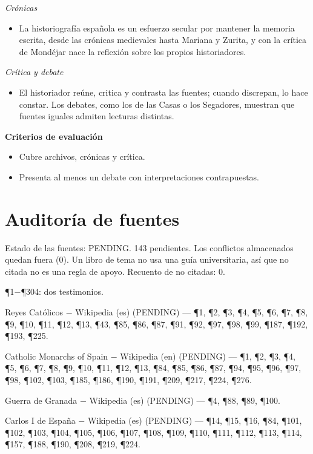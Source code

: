 \documentclass{book}
\begin{document}
\noindent\textit{Crónicas}
\begin{itemize}
\item La historiografía española es un esfuerzo secular por mantener la memoria escrita, desde las crónicas medievales hasta Mariana y Zurita, y con la crítica de Mondéjar nace la reflexión sobre los propios historiadores.
\end{itemize}

\noindent\textit{Crítica y debate}
\begin{itemize}
\item El historiador reúne, critica y contrasta las fuentes; cuando discrepan, lo hace constar. Los debates, como los de las Casas o los Segadores, muestran que fuentes iguales admiten lecturas distintas.
\end{itemize}

\noindent\textbf{Criterios de evaluación}
\begin{itemize}
\item Cubre archivos, crónicas y crítica.
\item Presenta al menos un debate con interpretaciones contrapuestas.
\end{itemize}
\chapter{Auditoría de fuentes}

\noindent Estado de las fuentes: PENDING. 143 pendientes. Los conflictos almacenados quedan fuera (0). Un libro de tema no usa una guía universitaria, así que no citada no es una regla de apoyo. Recuento de no citadas: 0.

\noindent ¶1\(-\)¶304: dos testimonios.

\medskip

\noindent Reyes Católicos \(-\) Wikipedia (es) (PENDING) --- \P1, \P2, \P3, \P4, \P5, \P6, \P7, \P8, \P9, \P10, \P11, \P12, \P13, \P43, \P85, \P86, \P87, \P91, \P92, \P97, \P98, \P99, \P187, \P192, \P193, \P225.

\noindent Catholic Monarchs of Spain \(-\) Wikipedia (en) (PENDING) --- \P1, \P2, \P3, \P4, \P5, \P6, \P7, \P8, \P9, \P10, \P11, \P12, \P13, \P84, \P85, \P86, \P87, \P94, \P95, \P96, \P97, \P98, \P102, \P103, \P185, \P186, \P190, \P191, \P209, \P217, \P224, \P276.

\noindent Guerra de Granada \(-\) Wikipedia (es) (PENDING) --- \P4, \P88, \P89, \P100.

\noindent Carlos I de España \(-\) Wikipedia (es) (PENDING) --- \P14, \P15, \P16, \P84, \P101, \P102, \P103, \P104, \P105, \P106, \P107, \P108, \P109, \P110, \P111, \P112, \P113, \P114, \P157, \P188, \P190, \P208, \P219, \P224.
\end{document}
